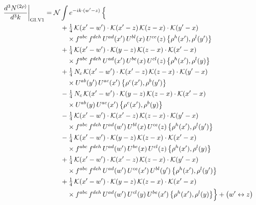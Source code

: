 \documentclass[10pt]{article}
\numberwithin{equation}{section}
\newcommand{\KK}{\mathcal K}
\newcommand{\NN}{\mathcal N}
\begin{document}
\begin{align}
\frac{d^3N^{(2\rho)}}{d^3k}\bigg|_{\rm GI.V1}={}&\NN\int e^{-ik\cdot(w'-z)}\,\Big\{\notag\\
&\quad +\tfrac14\,\KK(x'-w')\cdot\KK(x'-z)\,\KK(z-x)\cdot\KK(y'-x)\notag\\
&\qquad\times f^{abc}\,f^{deh}\,U^{ad}(x')\,U^{bl}(x)\,U^{ce}(z)\,\big\{\rho^{h}(x'),\rho^{l}(y')\big\}\notag\\
&\quad +\tfrac14\,\KK(x'-w')\cdot\KK(y-z)\,\KK(z-x)\cdot\KK(x'-x)\notag\\
&\qquad\times f^{abc}\,f^{deh}\,U^{ad}(x')\,U^{be}(x)\,U^{cl}(z)\,\big\{\rho^{h}(x'),\rho^{l}(y)\big\}\notag\\
&\quad +\tfrac14\,N_{c}\,\KK(x'-w')\cdot\KK(x'-z)\,\KK(z-x)\cdot\KK(y'-x)\notag\\
&\qquad\times U^{ab}(y')\,U^{ac}(x')\,\big\{\rho^{c}(x'),\rho^{b}(y')\big\}\notag\\
&\quad -\tfrac14\,N_{c}\,\KK(x'-w')\cdot\KK(y-z)\,\KK(z-x)\cdot\KK(x'-x)\notag\\
&\qquad\times U^{ab}(y)\,U^{ac}(x')\,\big\{\rho^{c}(x'),\rho^{b}(y)\big\}\notag\\
&\quad -\tfrac14\,\KK(x'-w')\cdot\KK(x'-z)\,\KK(z-x)\cdot\KK(y'-x)\notag\\
&\qquad\times f^{abc}\,f^{deh}\,U^{ad}(w')\,U^{bl}(x)\,U^{ce}(z)\,\big\{\rho^{h}(x'),\rho^{l}(y')\big\}\notag\\
&\quad -\tfrac14\,\KK(x'-w')\cdot\KK(y-z)\,\KK(z-x)\cdot\KK(x'-x)\notag\\
&\qquad\times f^{abc}\,f^{deh}\,U^{ad}(w')\,U^{be}(x)\,U^{cl}(z)\,\big\{\rho^{h}(x'),\rho^{l}(y)\big\}\notag\\
&\quad +\tfrac14\,\KK(x'-w')\cdot\KK(x'-z)\,\KK(z-x)\cdot\KK(y'-x)\notag\\
&\qquad\times f^{abc}\,f^{deh}\,U^{ad}(w')\,U^{ce}(x')\,U^{bl}(y')\,\big\{\rho^{h}(x'),\rho^{l}(y')\big\}\notag\\
&\quad +\tfrac14\,\KK(x'-w')\cdot\KK(y-z)\,\KK(z-x)\cdot\KK(x'-x)\notag\\
&\qquad\times f^{abc}\,f^{deh}\,U^{ad}(w')\,U^{cl}(y)\,U^{be}(x')\,\big\{\rho^{h}(x'),\rho^{l}(y)\big\}\Big\}+\big(w'\leftrightarrow z\big)\label{eq:sum-GI.V1}
\end{align}
\end{document}
